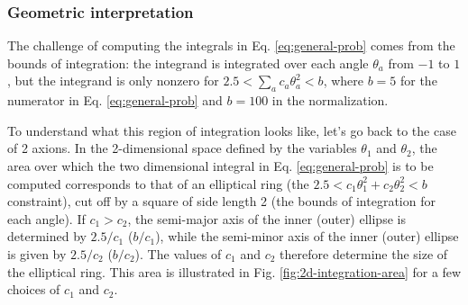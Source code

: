 \documentclass[11pt]{article}
\begin{document}
\subsubsection{Geometric interpretation}
\label{subsubsec:geom-interpret}
The challenge of computing the integrals in Eq. \eqref{eq:general-prob} comes from the bounds of integration: the integrand is integrated over each angle $\theta_a$ from $-1$ to $1$, but the integrand is only nonzero for $2.5<\sum_a c_a\theta_a^2<b$, where $b=5$ for the numerator in Eq. \eqref{eq:general-prob} and $b=100$ in the normalization.

To understand what this region of integration looks like, let's go back to the case of 2 axions. In the 2-dimensional space defined by the variables $\theta_1$ and $\theta_2$, the area over which the two dimensional integral in Eq. \eqref{eq:general-prob} is to be computed corresponds to that of an elliptical ring (the $2.5<c_1\theta_1^2+c_2\theta_2^2<b$ constraint), cut off by a square of side length 2 (the bounds of integration for each angle). If $c_1>c_2$, the semi-major axis of the inner (outer) ellipse is determined by $2.5/c_1$ ($b/c_1$), while the semi-minor axis of the inner (outer) ellipse is given by $2.5/c_2$ ($b/c_2$). The values of $c_1$ and $c_2$ therefore determine the size of the elliptical ring. This area is illustrated in Fig. \ref{fig:2d-integration-area} for a few choices of $c_1$ and $c_2$.
\end{document}
